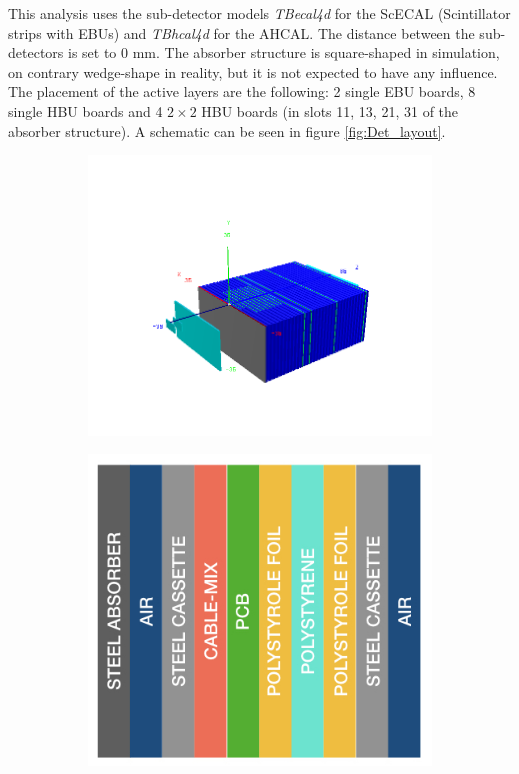 This analysis uses the sub-detector \mokka models \textit{TBecal4d} for the ScECAL (Scintillator strips with EBUs) and \textit{TBhcal4d} for the AHCAL. The distance between the sub-detectors is set to 0 mm. The absorber structure is square-shaped in simulation, on contrary wedge-shape in reality, but it is not expected to have any influence. The placement of the active layers are the following: 2 single EBU boards, 8 single HBU boards and 4 $2\times2$ HBU boards (in slots 11, 13, 21, 31 of the absorber structure). A schematic can be seen in figure \ref{fig:Det_layout}.
\begin{figure}[htbp!]
  \centering
  \begin{subfigure}[t]{0.59\textwidth}
    \includegraphics[width=1.\linewidth]{chap4/fig/DD4hep_AHCALModel.png}
    \caption{} \label{fig:GeomModel}
  \end{subfigure}
  \hfill
  \begin{subfigure}[t]{0.39\textwidth}
    \includegraphics[width=1.\linewidth]{chap4/fig/Structure.jpeg}

\end{subfigure}
\end{figure}
